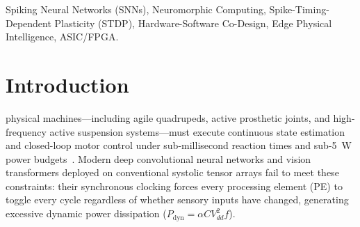 \documentclass[journal]{IEEEtran}
\theoremstyle{definition}
\begin{document}
\begin{abstract}
The manuscript provides mathematical derivations for synaptic weight boundedness under Poisson jitter and worst-case memory arbitration stalls (proof review pending). Evaluation (3 seeds unless noted): on the Spiking Heidelberg Digits benchmark, the recurrent PLIF configuration reaches \textbf{77.87\% $\pm$ 1.10\%} (versus 74.26\% $\pm$ 0.53\% for the non-recurrent ablation and 70.02\% $\pm$ 2.10\% for an identically trained snntorch baseline) with an 89.4\% modeled reduction in synaptic operations. The published SRNN and PLIF references remain 14.6--14.8 points higher; the gap decomposition is recorded in \texttt{EVIDENCE.md}. The RTL core passes its self-checking simulation, synthesizes to 890 cells on ECP5, and routes at a 132.29~MHz maximum-frequency estimate against a 50~MHz target; the .NET driver measures 8.97~Mpps with 55.7~ns mean dispatch latency (host-dependent). Energy remains a C-engine model estimate (4.43~pJ/SOP event mode); the MNIST-era figures are retained as historical records only, and peak-throughput figures are withdrawn pending one reconciled measurement run. Board power measurements remain future work.
\end{abstract}

\begin{IEEEkeywords}
Spiking Neural Networks (SNNs), Neuromorphic Computing, Spike-Timing-Dependent Plasticity (STDP), Hardware-Software Co-Design, Edge Physical Intelligence, ASIC/FPGA.
\end{IEEEkeywords}

\section{Introduction}
 physical machines—including agile quadrupeds, active prosthetic joints, and high-frequency active suspension systems—must execute continuous state estimation and closed-loop motor control under sub-millisecond reaction times and sub-5~W power budgets~\cite{maass1997,davies2018}. Modern deep convolutional neural networks and vision transformers deployed on conventional systolic tensor arrays fail to meet these constraints: their synchronous clocking forces every processing element (PE) to toggle every cycle regardless of whether sensory inputs have changed, generating excessive dynamic power dissipation ($P_{\text{dyn}} = \alpha C V_{dd}^2 f$).
\end{document}

